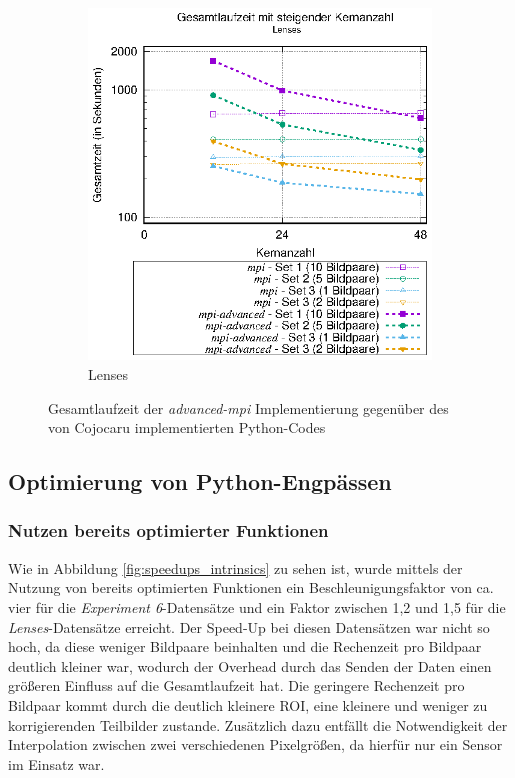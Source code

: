 \begin{center}
\begin{figure}[h]
\begin{subfigure}[b]{0.45\textwidth}
			\includegraphics[width=\textwidth]{pdf/mpi_advanced_times_lenses}
			\caption{Lenses}
			\label{fig:mpi_advanced_times_lenses}
		\end{subfigure}
		\caption{Gesamtlaufzeit der \textit{advanced-mpi} Implementierung gegenüber des von Cojocaru implementierten Python-Codes}
		\label{fig:mpi_advanced_times}
	\end{figure}
\end{center}

\subsection{Optimierung von Python-Engpässen}

\subsubsection{Nutzen bereits optimierter Funktionen}

Wie in Abbildung \ref{fig:speedups_intrinsics} zu sehen ist, wurde mittels der Nutzung von bereits optimierten Funktionen ein Beschleunigungsfaktor von ca. vier für die \textit{Experiment 6}-Datensätze und ein Faktor zwischen 1,2 und 1,5 für die \textit{Lenses}-Datensätze erreicht. Der Speed-Up bei diesen Datensätzen war nicht so hoch, da diese weniger Bildpaare beinhalten und die Rechenzeit pro Bildpaar deutlich kleiner war, wodurch der Overhead durch das Senden der Daten einen größeren Einfluss auf die Gesamtlaufzeit hat. Die geringere Rechenzeit pro Bildpaar kommt durch die deutlich kleinere \gls{ROI}, eine kleinere   und weniger zu korrigierenden Teilbilder zustande. Zusätzlich dazu entfällt die Notwendigkeit der Interpolation zwischen zwei verschiedenen Pixelgrößen, da hierfür nur ein Sensor im Einsatz war.

